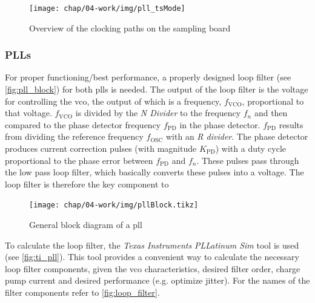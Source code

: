 \begin{figure}[tbh]
	\centering
	\texttt{[image: chap/04-work/img/pll\_tsMode]}
	\caption{Overview of the clocking paths on the sampling board}
	\label{fig:clocking}
\end{figure}

\subsubsection*{PLLs}
For proper functioning/best performance, a properly designed loop filter (see \autoref{fig:pll_block}) for both \glspl{pll} is needed. 
The output of the loop filter is the voltage for controlling the \gls{vco}, the output of which is a frequency, $f_\text{VCO}$, proportional to that voltage.
$f_\text{VCO}$ is divided by the \textit{N Divider} to the frequency $f_n$ and then compared to the phase detector frequency $f_\text{PD}$ in the phase detector. 
$f_\text{PD}$ results from dividing the reference frequency $f_\text{OSC}$ with an \textit{R divider}. 
The phase detector produces current correction pulses (with magnitude $K_\text{PD}$) with a duty cycle proportional to the phase error between $f_\text{PD}$ and $f_n$. 
These pulses pass through the low pass loop filter, which basically converts these pulses into a voltage. \cite{pll_design}
The loop filter is therefore the key component to 

\begin{figure}[tbh]
	\centering
	\texttt{[image: chap/04-work/img/pllBlock.tikz]}
	\caption[PLL block diagram]{General block diagram of a \gls{pll} \cite{pll_design}}
	\label{fig:pll_block}
\end{figure}

To calculate the loop filter, the \textit{Texas Instruments} \textit{PLLatinum Sim} tool is used (see \autoref{fig:ti_pll}). This tool provides a convenient way to calculate the necessary loop filter components, given the \gls{vco} characteristics, desired filter order, charge pump current and desired performance (e.g. optimize jitter). For the names of the filter components refer to \autoref{fig:loop_filter}.


